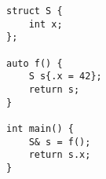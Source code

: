 \begin{lstlisting}[title=\href{https://godbolt.org/z/x4rWKj}{\texttt{godbolt.org/z/x4rWKj}}]
struct S {
    int x;
};

auto f() {
    S s{.x = 42};
    return s;
}

int main() {
    S& s = f();
    return s.x;
}
\end{lstlisting}
